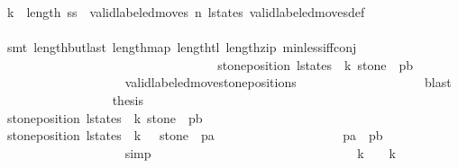 \begin{isabellebody}
\ {\isacartoucheopen}k{}\ {\isacharless}\ length\ {\isacharquery}ss{\isacartoucheclose}\ \ {\isacartoucheopen}valid{\isacharunderscore}labeled{\isacharunderscore}moves\ n\ l{\isacharunderscore}states{\isacartoucheclose}\ valid{\isacharunderscore}labeled{\isacharunderscore}moves{\isacharunderscore}def\isanewline
\ \ \ \ \ \ \ \ \ \ \ \ \ \ \ \ \ \ \isamarkupfalse%
\ {\isacharparenleft}smt\ length{\isacharunderscore}butlast\ length{\isacharunderscore}map\ length{\isacharunderscore}tl\ length{\isacharunderscore}zip\ min{\isacharunderscore}less{\isacharunderscore}iff{\isacharunderscore}conj{\isacharparenright}\isanewline
\ \ \ \ \ \ \ \ \ \ \ \ \ \ \ \ \isamarkupfalse%
\isanewline
\ \ \ \ \ \ \ \ \ \ \ \ \ \ \ \ \isamarkupfalse%
\ {\isachardoublequoteopen}stone{\isacharunderscore}position\ {\isacharparenleft}l{\isacharunderscore}states\ {\isacharbang}\ k{}{\isacharparenright}\ stone\ {\isacharequal}\ p{}b{\isachardoublequoteclose}\isanewline
\ \ \ \ \ \ \ \ \ \ \ \ \ \ \ \ \ \ \isamarkupfalse%
\ valid{\isacharunderscore}labeled{\isacharunderscore}move{\isacharprime}{\isacharunderscore}stone{\isacharunderscore}positions\isanewline
\ \ \ \ \ \ \ \ \ \ \ \ \ \ \ \ \ \ \isamarkupfalse%
\ blast\isanewline
\isanewline
\ \ \ \ \ \ \ \ \ \ \ \ \ \ \ \ \isamarkupfalse%
\ {\isacharquery}thesis\isanewline
\ \ \ \ \ \ \ \ \ \ \ \ \ \ \ \ \ \ \isamarkupfalse%
\ {\isacharbackquoteopen}stone{\isacharunderscore}position\ {\isacharparenleft}l{\isacharunderscore}states\ {\isacharbang}\ k{}{\isacharparenright}\ stone\ {\isacharequal}\ p{}b{\isacharbackquoteclose}\isanewline
\ \ \ \ \ \ \ \ \ \ \ \ \ \ \ \ \ \ \isamarkupfalse%
\ {\isacharbackquoteopen}stone{\isacharunderscore}position\ {\isacharparenleft}l{\isacharunderscore}states\ {\isacharbang}\ {\isacharparenleft}k{}\ {\isacharplus}\ {}{\isacharparenright}{\isacharparenright}\ stone\ {\isacharequal}\ p{}a{\isacharbackquoteclose}\isanewline
\ \ \ \ \ \ \ \ \ \ \ \ \ \ \ \ \ \ \isamarkupfalse%
\ {\isacharbackquoteopen}p{}a\ {\isasymnoteq}\ p{}b{\isacharbackquoteclose}\isanewline
\ \ \ \ \ \ \ \ \ \ \ \ \ \ \ \ \ \ \isamarkupfalse%
\ simp\isanewline
\ \ \ \ \ \ \ \ \ \ \ \ \ \ \isamarkupfalse%
\isanewline
\ \ \ \ \ \ \ \ \ \ \ \ \ \ \isamarkupfalse%
\ \isamarkupfalse%
\ {\isachardoublequoteopen}k{}\ {\isacharplus}\ {}\ {\isacharless}\ k{}{\isachardoublequoteclose}\isanewline

\end{isabellebody}

